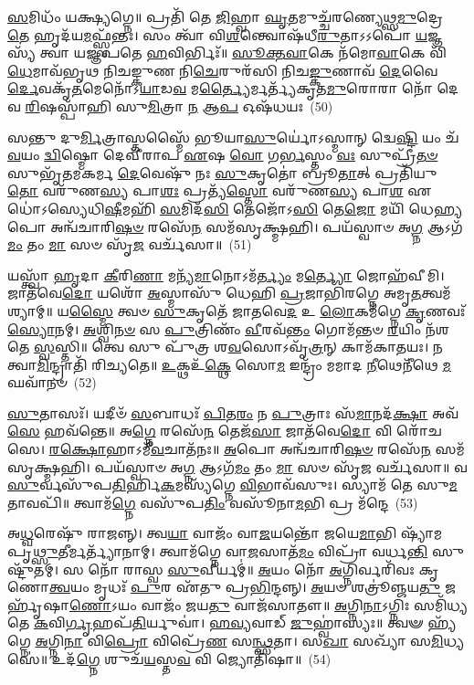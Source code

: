 \-\ul{𑌸}\-𑌮𑌿𑌧𑌂᳴ 𑌯𑌕𑍍𑌷𑍍𑌯𑌗𑍍𑌨𑍇॥ 𑌪𑍍𑌰𑌤𑌿᳴ 𑌤𑍇 \ul{𑌜𑌿}\-𑌹𑍍𑌵𑌾 \ul{𑌘𑍃}\-𑌤𑌮𑍁𑌚𑍍𑌚᳴𑌰𑌣𑍍𑌯𑍇𑌥𑍍𑌸\-\ul{𑌮𑍁}\-𑌦𑍍𑌰𑍇 \ul{𑌤𑍇} 𑌹𑍃𑌦᳴𑌯\-\ul{𑌮}\-𑌫𑍍𑌸𑍍𑌵᳴𑌨𑍍𑌤𑌃। 𑌸𑌂 𑌤𑍍𑌵𑌾᳴ 𑌵𑌿\-\ul{𑌶}\-𑌨𑍍𑌤𑍍𑌵𑍋𑌷᳴𑌧𑍀\-\ul{𑌰𑍁}\-𑌤𑌾\-𑌽\-𑌽𑌪𑍋᳴ \ul{𑌯}\-𑌜𑍍𑌞𑌸𑍍𑌯᳴ 𑌤𑍍𑌵𑌾 𑌯𑌜𑍍𑌞𑌪𑌤𑍇 \ul{𑌹}\-𑌵𑌿𑌰𑍍𑌭𑌿𑌃᳴॥ \ul{𑌸𑍂}\-\-\ul{𑌕𑍍𑌤}\-\-\ul{𑌵𑌾}\-𑌕𑍇 𑌨᳴𑌮𑍋\-\ul{𑌵𑌾}\-𑌕𑍇 𑌵𑌿᳴\-\ul{𑌧𑍇}\-𑌮𑌾𑌵᳴𑌭𑍃𑌥 𑌨𑌿𑌚𑌙𑍍𑌕𑍁𑌣 𑌨𑌿\-\ul{𑌚𑍇}\-𑌰𑍁𑌰᳴𑌸𑌿 𑌨𑌿𑌚\-\ul{𑌙𑍍𑌕𑍁}\-𑌣𑌾𑌵᳴ \ul{𑌦𑍇}\-𑌵𑍈\-\ul{𑌰𑍍𑌦𑍇}\-𑌵𑌕𑍃᳴\-\ul{𑌤}\-𑌮𑍇𑌨𑍋᳴\-𑌽\-\ul{𑌯𑌾}\-𑌡\-\ul{𑌵} 𑌮\-\ul{𑌰𑍍𑌤𑍍𑌯𑍈}\-𑌰𑍍𑌮𑌰𑍍𑌤𑍍𑌯᳴𑌕𑍃𑌤\-\ul{𑌮𑍁}\-𑌰𑍋𑌰𑌾 𑌨𑍋᳴ 𑌦𑍇𑌵 \ul{𑌰𑌿}\-𑌷𑌸𑍍𑌪𑌾᳴𑌹𑌿 𑌸𑍁\-\ul{𑌮𑌿}\-𑌤𑍍𑌰𑌾 \ul{𑌨} 𑌆\-\ul{𑌪} 𑌓𑌷᳴𑌧𑌯𑌃~(50)

𑌸𑌨𑍍𑌤𑍁 𑌦𑍁\-\ul{𑌰𑍍𑌮𑌿}\-𑌤𑍍𑌰𑌾𑌸𑍍𑌤𑌸𑍍𑌮𑍈᳴ 𑌭𑍂𑌯𑌾\-\ul{𑌸𑍁}\-𑌰𑍍𑌯𑍋॑\-𑌽𑌸𑍍𑌮𑌾𑌨𑍍 𑌦𑍍𑌵𑍇\-\ul{𑌷𑍍𑌟𑌿} 𑌯𑌂 𑌚᳴ \ul{𑌵}\-𑌯𑌂 \ul{𑌦𑍍𑌵𑌿}\-𑌷𑍍𑌮𑍋 𑌦𑍇𑌵𑍀᳴𑌰𑌾𑌪 \ul{𑌏}\-𑌷 \ul{𑌵𑍋} 𑌗\-\ul{𑌰𑍍𑌭}\-𑌸𑍍𑌤𑌂 \ul{𑌵𑌃} 𑌸𑍁𑌪𑍍𑌰𑍀᳴\-\ul{𑌤}\-\-\ul{𑍞} 𑌸𑍁𑌭𑍃᳴𑌤𑌮𑌕𑌰𑍍𑌮 \ul{𑌦𑍇}\-𑌵𑍇𑌷𑍁᳴ 𑌨𑌃 \ul{𑌸𑍁}\-𑌕𑍃𑌤𑍋॑ 𑌬𑍍𑌰𑍂\-\ul{𑌤𑌾}\-𑌤𑍍 𑌪𑍍𑌰𑌤𑌿᳴𑌯𑍁\-\ul{𑌤𑍋} 𑌵𑌰𑍁᳴𑌣\-\ul{𑌸𑍍𑌯} 𑌪𑌾\-\ul{𑌶𑌃} 𑌪𑍍𑌰𑌤𑍍𑌯᳴\-\ul{𑌸𑍍𑌤𑍋} 𑌵𑌰𑍁᳴𑌣\-\ul{𑌸𑍍𑌯} 𑌪𑌾\-\ul{𑌶} 𑌏𑌧𑍋॑\-𑌽𑌸𑍍𑌯𑍇𑌧𑌿\-\ul{𑌷𑍀}\-𑌮𑌹𑌿᳴ \ul{𑌸}\-𑌮𑌿𑌦᳴\-\ul{𑌸𑌿} 𑌤𑍇𑌜𑍋᳴\-𑌽\-\ul{𑌸𑌿} 𑌤𑍇\-\ul{𑌜𑍋} 𑌮𑌯𑌿᳴ 𑌧𑍇\-\ul{𑌹𑍍𑌯}\-𑌪𑍋 𑌅𑌨𑍍𑌵᳴𑌚𑌾𑌰𑌿\-\ul{𑌷}\-\-\ul{𑍞} 𑌰𑌸𑍇᳴\-\ul{𑌨} 𑌸𑌮᳴𑌸𑍃𑌕𑍍𑌷𑍍𑌮𑌹𑌿। 𑌪𑌯᳴𑌸𑍍𑌵𑌾𑍞 𑌅\-\ul{𑌗𑍍𑌨} 𑌆\-𑌽𑌗᳴\-\ul{𑌮𑌂} 𑌤𑌂 \ul{𑌮𑌾} 𑌸𑍞 𑌸𑍃᳴\-\ul{𑌜} 𑌵𑌰𑍍𑌚᳴𑌸𑌾॥~(51)

{\anuvakamend[{𑌦𑌮𑍇᳴𑌦\-\ul{𑌮} 𑌓𑌷᳴𑌧\-\ul{𑌯} 𑌆 𑌷𑌟𑍍 𑌚᳴}]}%

𑌯𑌸𑍍𑌤𑍍𑌵𑌾᳴ \ul{𑌹𑍃}\-𑌦𑌾 \ul{𑌕𑍀}\-𑌰𑌿\-\ul{𑌣𑌾} 𑌮𑌨𑍍𑌯᳴\-\ul{𑌮𑌾}\-𑌨𑍋\-𑌽𑌮᳴\-\ul{𑌰𑍍𑌤𑍍𑌯𑌂} 𑌮\-\ul{𑌰𑍍𑌤𑍍𑌯𑍋} 𑌜𑍋𑌹᳴𑌵𑍀𑌮𑌿। 𑌜𑌾𑌤᳴𑌵𑍇\-\ul{𑌦𑍋} 𑌯𑌶𑍋᳴ \ul{𑌅}\-𑌸𑍍𑌮𑌾𑌸𑍁᳴ 𑌧𑍇𑌹𑌿 \ul{𑌪𑍍𑌰}\-𑌜𑌾𑌭𑌿᳴𑌰𑌗𑍍𑌨𑍇 𑌅𑌮𑍃\-\ul{𑌤}\-𑌤𑍍𑌵𑌮᳴𑌶𑍍𑌯𑌾𑌮𑍍॥ 𑌯\-\ul{𑌸𑍍𑌮𑍈} 𑌤𑍍𑌵𑍞 \ul{𑌸𑍁}\-𑌕𑍃𑌤𑍇᳴ 𑌜𑌾𑌤𑌵𑍇\-\ul{𑌦} 𑌉 \ul{𑌲𑍋}\-𑌕𑌮᳴𑌗𑍍𑌨𑍇 \ul{𑌕𑍃}\-𑌣𑌵𑌃᳴ \ul{𑌸𑍍𑌯𑍋}\-𑌨𑌮𑍍। \ul{𑌅}\-𑌶𑍍𑌵𑌿\-\ul{𑌨}\-\-\ul{𑍞} 𑌸 \ul{𑌪𑍁}\-𑌤𑍍𑌰𑌿𑌣𑌂᳴ \ul{𑌵𑍀}\-𑌰𑌵᳴\-\ul{𑌨𑍍𑌤𑌂} 𑌗𑍋𑌮᳴𑌨𑍍𑌤𑍞 \ul{𑌰}\-𑌯𑌿𑌂 𑌨᳴𑌶𑌤𑍇 \ul{𑌸𑍍𑌵}\-𑌸𑍍𑌤𑌿॥ 𑌤𑍍𑌵𑍇 𑌸𑍁 𑌪𑍁᳴𑌤𑍍𑌰 𑌶\-\ul{𑌵}\-𑌸𑍋\-𑌽𑌵𑍃᳴\-\ul{𑌤𑍍𑌰}\-𑌨𑍍 𑌕𑌾𑌮᳴𑌕𑌾𑌤𑌯𑌃। 𑌨 𑌤𑍍𑌵𑌾\-\ul{𑌮𑌿}\-𑌨𑍍𑌦𑍍𑌰𑌾𑌤𑌿᳴ 𑌰𑌿𑌚𑍍𑌯𑌤𑍇॥ \ul{𑌉}\-𑌕𑍍𑌥𑌉᳴\-\ul{𑌕𑍍𑌥𑍇} 𑌸𑍋\-\ul{𑌮} 𑌇𑌨𑍍𑌦𑍍𑌰𑌂᳴ 𑌮𑌮𑌾𑌦 \ul{𑌨𑍀}\-𑌥𑍇𑌨𑍀᳴𑌥𑍇 \ul{𑌮}\-𑌘𑌵𑌾᳴𑌨𑍞~(52)

\-\ul{𑌸𑍁}\-𑌤𑌾𑌸𑌃᳴। 𑌯𑌦𑍀𑍞᳴ \ul{𑌸}\-𑌬𑌾𑌧𑌃᳴ \ul{𑌪𑌿}\-𑌤\-\ul{𑌰𑌂} 𑌨 \ul{𑌪𑍁}\-𑌤𑍍𑌰𑌾𑌃 𑌸᳴\-\ul{𑌮𑌾}\-𑌨𑌦᳴\-\ul{𑌕𑍍𑌷𑌾} 𑌅𑌵᳴\-\ul{𑌸𑍇} 𑌹𑌵᳴𑌨𑍍𑌤𑍇॥ 𑌅\-\ul{𑌗𑍍𑌨𑍇} 𑌰𑌸𑍇᳴\-\ul{𑌨} 𑌤𑍇𑌜᳴\-\ul{𑌸𑌾} 𑌜𑌾𑌤᳴𑌵𑍇\-\ul{𑌦𑍋} 𑌵𑌿 𑌰𑍋᳴𑌚𑌸𑍇। \ul{𑌰}\-\-\ul{𑌕𑍍𑌷𑍋}\-𑌹𑌾\-𑌽𑌮𑍀᳴\-\ul{𑌵}\-𑌚𑌾𑌤᳴𑌨𑌃॥ \ul{𑌅}\-𑌪𑍋 𑌅𑌨𑍍𑌵᳴𑌚𑌾𑌰𑌿\-\ul{𑌷}\-\-\ul{𑍞} 𑌰𑌸𑍇᳴\-\ul{𑌨} 𑌸𑌮᳴𑌸𑍃𑌕𑍍𑌷𑍍𑌮𑌹𑌿। 𑌪𑌯᳴𑌸𑍍𑌵𑌾𑍞 𑌅\-\ul{𑌗𑍍𑌨} 𑌆\-𑌽𑌗᳴\-\ul{𑌮𑌂} 𑌤𑌂 \ul{𑌮𑌾} 𑌸𑍞 𑌸𑍃᳴\-\ul{𑌜} 𑌵𑌰𑍍𑌚᳴𑌸𑌾॥ 𑌵\-\ul{𑌸𑍁}\-𑌰𑍍𑌵𑌸𑍁᳴𑌪\-\ul{𑌤𑌿}\-𑌰𑍍\mbox{}𑌹𑌿\-\ul{𑌕}\-𑌮𑌸𑍍𑌯᳴𑌗𑍍𑌨𑍇 \ul{𑌵𑌿}\-𑌭𑌾𑌵᳴𑌸𑍁𑌃। 𑌸𑍍𑌯𑌾𑌮᳴ 𑌤𑍇 𑌸𑍁\-\ul{𑌮}\-𑌤𑌾𑌵𑌪𑌿᳴॥ 𑌤𑍍𑌵𑌾𑌮᳴\-\ul{𑌗𑍍𑌨𑍇} 𑌵𑌸𑍁᳴𑌪\-\ul{𑌤𑌿𑌂} 𑌵𑌸𑍂᳴𑌨𑌾\-\ul{𑌮}\-𑌭𑌿 𑌪𑍍𑌰 𑌮᳴𑌨𑍍𑌦𑍇~(53)

𑌅\-\ul{𑌧𑍍𑌵}\-𑌰𑍇𑌷𑍁᳴ 𑌰𑌾𑌜𑌨𑍍𑌨𑍍। 𑌤𑍍𑌵\-\ul{𑌯𑌾} 𑌵𑌾𑌜𑌂᳴ 𑌵𑌾\-\ul{𑌜}\-𑌯𑌨𑍍𑌤𑍋᳴ 𑌜𑌯𑍇\-\ul{𑌮𑌾}\-𑌭𑌿 𑌷𑍍𑌯𑌾᳴𑌮 𑌪𑍃\-\ul{𑌥𑍍𑌸𑍁}\-𑌤𑍀𑌰𑍍𑌮𑌰𑍍𑌤𑍍𑌯𑌾᳴𑌨𑌾𑌮𑍍। 𑌤𑍍𑌵𑌾𑌮᳴𑌗𑍍𑌨𑍇 𑌵𑌾\-\ul{𑌜}\-𑌸𑌾𑌤᳴\-\ul{𑌮𑌂} 𑌵𑌿𑌪𑍍𑌰𑌾᳴ 𑌵𑌰𑍍𑌧\-\ul{𑌨𑍍𑌤𑌿} 𑌸𑍁𑌷𑍍𑌟𑍁᳴𑌤𑌮𑍍। 𑌸 𑌨𑍋᳴ 𑌰𑌾𑌸𑍍𑌵 \ul{𑌸𑍁}\-𑌵𑍀𑌰𑍍𑌯𑌮𑍍॑॥ \ul{𑌅}\-𑌯𑌂 𑌨𑍋᳴ \ul{𑌅}\-𑌗𑍍𑌨𑌿𑌰𑍍𑌵𑌰𑌿᳴𑌵𑌃 𑌕𑍃𑌣𑍋\-\ul{𑌤𑍍𑌵}\-𑌯𑌂 𑌮𑍃𑌧𑌃᳴ \ul{𑌪𑍁}\-𑌰 𑌏᳴𑌤𑍁 𑌪𑍍𑌰\-\ul{𑌭𑌿}\-𑌨𑍍𑌦𑌨𑍍𑌨𑍍। \ul{𑌅}\-𑌯𑍞 𑌶𑌤𑍍𑌰𑍂॑𑌞𑍍𑌜𑌯\-\ul{𑌤𑍁} 𑌜𑌰𑍍\mbox{}𑌹𑍃᳴𑌷𑌾\-\ul{𑌣𑍋}\-\-𑌽𑌯𑌂 𑌵𑌾𑌜𑌂᳴ 𑌜𑌯\-\ul{𑌤𑍁} 𑌵𑌾𑌜᳴𑌸𑌾𑌤𑍗॥ \ul{𑌅}\-𑌗𑍍𑌨𑌿\-\ul{𑌨𑌾}\-𑌽𑌗𑍍𑌨𑌿𑌃 𑌸𑌮𑌿᳴𑌧𑍍𑌯𑌤𑍇 \ul{𑌕}\-𑌵𑌿\-\ul{𑌰𑍍𑌗𑍃}\-𑌹𑌪᳴\-\ul{𑌤𑌿}\-𑌰𑍍𑌯𑍁𑌵𑌾॑। \ul{𑌹}\-\-\ul{𑌵𑍍𑌯}\-𑌵𑌾𑌡𑍍 \ul{𑌜𑍁}\-𑌹𑍍𑌵𑌾॑𑌸𑍍𑌯𑌃॥ 𑌤𑍍𑌵𑍟 𑌹𑍍𑌯᳴𑌗𑍍𑌨𑍇 \ul{𑌅}\-𑌗𑍍𑌨𑌿\-\ul{𑌨𑌾} 𑌵𑌿\-\ul{𑌪𑍍𑌰𑍋} 𑌵𑌿𑌪𑍍𑌰𑍇᳴\-\ul{𑌣} 𑌸\-\ul{𑌨𑍍𑌥𑍍𑌸}\-𑌤𑌾। 𑌸\-\ul{𑌖𑌾} 𑌸𑌖𑍍𑌯𑌾᳴ 𑌸\-\ul{𑌮𑌿}\-𑌧𑍍𑌯𑌸𑍇॑॥ 𑌉𑌦᳴\-\ul{𑌗𑍍𑌨𑍇} 𑌶𑍁𑌚᳴\-\ul{𑌯}\-𑌸𑍍𑌤\-\ul{𑌵} 𑌵𑌿 𑌜𑍍𑌯𑍋𑌤𑌿᳴𑌷𑌾॥~(54)

